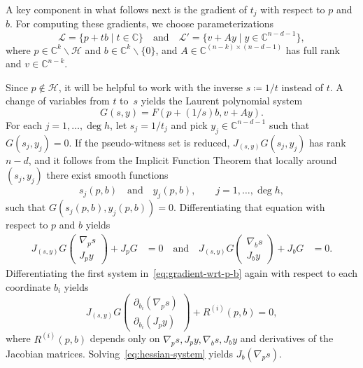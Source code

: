 \documentclass[11pt]{article}
\numberwithin{equation}{section}
\theoremstyle{plain}
\theoremstyle{definition}
\theoremstyle{remark}
\newcommand{\sH}{{\mathcal H}}
\newcommand\bC{{\mathbb C}}
\begin{document}
A key component in what follows next is the gradient of $t_j$ with respect to $p$ and $b$. For computing these gradients, we choose parameterizations\enlargethispage{\baselineskip}
$$\mathcal{L} = \{p +t b \mid t\in \bC\}\quad\text{and}\quad \mathcal{L}' = \{v + Ay \mid y\in \bC^{n-d-1}\},$$
where $p \in \bC^{k}\smallsetminus \sH$ and $b\in \bC^{k}\smallsetminus\{0\}$, and $A\in\mathbb C^{(n-k)\times (n-d-1)}$ has full rank and $v\in \bC^{n-k}$. 

Since $p\notin\sH$, it will be helpful to work with the inverse $s \coloneq 1/t$ instead of $t$. A change of variables from $t$ to~$s$ yields the Laurent polynomial system 
$$G(s,y) = F(p + (1/s)b, v+Ay).$$
For each $j=1,\ldots,\deg h$, let $s_j=1/t_j$ and pick $y_j\in\bC^{n-d-1}$ such that $G(s_{j},y_{j})=0$. If the pseudo-witness set is reduced, $J_{(s,y)}G(s_j,y_j)$ has rank $n-d$, and it follows from the Implicit Function Theorem that locally around $(s_{j},y_{j})$ there exist smooth functions
\begin{equation}
\label{eq:definition_of_sj_and_yj}
s_j(p, b)\quad \text{and}\quad y_j(p, b),\qquad j=1,\ldots,\deg h,
\end{equation}
such that $G(s_j(p,b), y_j(p,b))=0$. 
Differentiating that equation with respect to $p$ and $b$ yields
\begin{equation}\label{eq:gradient-wrt-p-b}
\begin{aligned}
    J_{(s,y)}G
    \begin{pmatrix}
        \nabla_{p}s \\ J_{p}y
    \end{pmatrix} 
    + J_{p}G &= 0 \quad \text{and} \quad 
    J_{(s,y)}G
    \begin{pmatrix}
        \nabla_{b}s \\ J_{b}y
    \end{pmatrix} 
    + J_{b}G &= 0.
    \end{aligned}
\end{equation}
Differentiating the first system in~\eqref{eq:gradient-wrt-p-b} again with respect to each coordinate $b_{i}$ yields
\begin{equation}\label{eq:hessian-system}
J_{(s,y)}G
\begin{pmatrix}
    \partial_{b_{i}}(\nabla_{p}s) \\ \partial_{b_{i}}(J_{p}y)
\end{pmatrix}
+
R^{(i)}(p,b) = 0,
\end{equation}
where $R^{(i)}(p,b)$ depends only on $\nabla_{p}s, J_{p}y, \nabla_{b}s, J_{b}y$ and derivatives of the Jacobian matrices. Solving~\eqref{eq:hessian-system} yields $J_{b}(\nabla_{p}s)$. 
\end{document}
